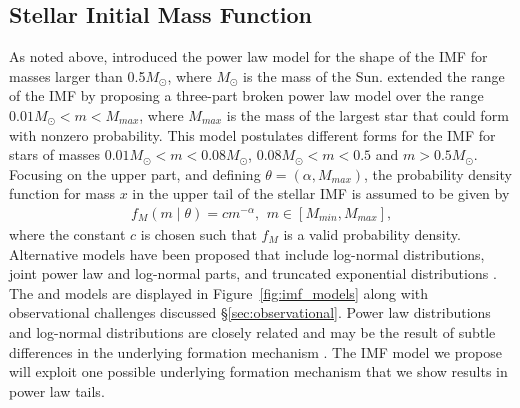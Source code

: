 \documentclass[12pt]{article}
\newcommand{\Msun}{M_{\odot}}
\begin{document}
\subsection{Stellar Initial Mass Function}

As noted above, \cite{salpeter55} introduced the power law model for the shape of the IMF for masses larger
than 0.5$\Msun$, where $\Msun$ is the mass of the Sun.
\cite{kroupa2001} extended the range of the IMF by proposing a three-part broken power law model 
over the range $0.01 \Msun < m < M_{max}$, where $M_{max}$ is the mass of the largest star that could form with nonzero probability.
This model postulates different forms for the IMF for stars of masses $0.01 \Msun < m < 0.08 \Msun$,
$0.08 \Msun < m < 0.5$ and $m > 0.5\Msun$.
Focusing on the upper part, and defining $\theta = (\alpha, M_{max})$, the probability density function for mass $x$ in the upper tail of the stellar IMF is assumed to be given by
\begin{align}
	f_M(m \mid \theta) = cm^{-\alpha}\text{,}\;\; m \in [M_{min}, M_{max}]\text{,}
	\label{eq:imf}
\end{align}
where the constant $c$ is chosen such that $f_M$ is a valid probability density.  Alternative models have been proposed that include log-normal distributions, joint power law and log-normal parts, and truncated exponential distributions {\color{red} \citep{chabrier2005,OffnerEtAl2014}.}  The \cite{kroupa2001} and \cite{chabrier2005} models are displayed in Figure~\ref{fig:imf_models} along with observational challenges discussed \S\ref{sec:observational}.
Power law distributions and log-normal distributions are closely related and may be the result of subtle differences in the underlying formation mechanism \citep{Mitzenmacher2004}.  The IMF model we propose will exploit one possible underlying formation mechanism that {\color{red} we show} results in power law tails.
\end{document}
